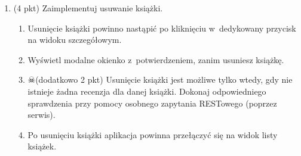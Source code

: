 \documentclass[12pt]{article}
\begin{document}
\begin{enumerate}
		\item
			(4 pkt) Zaimplementuj usuwanie książki.
			\begin{enumerate}
				\item Usunięcie książki powinno nastąpić po kliknięciu w~dedykowany przycisk na widoku szczegółowym.
				\item Wyświetl modalne okienko z~potwierdzeniem, zanim usuniesz książkę.
				\item $\skull$(dodatkowo 2 pkt) Usunięcie książki jest możliwe tylko wtedy, gdy nie istnieje żadna recenzja dla danej książki. Dokonaj odpowiedniego sprawdzenia przy pomocy osobnego zapytania RESTowego (poprzez serwis).
				\item Po usunięciu książki aplikacja powinna przełączyć się na widok listy książek.
			\end{enumerate}

    \end{enumerate}
\end{document}
